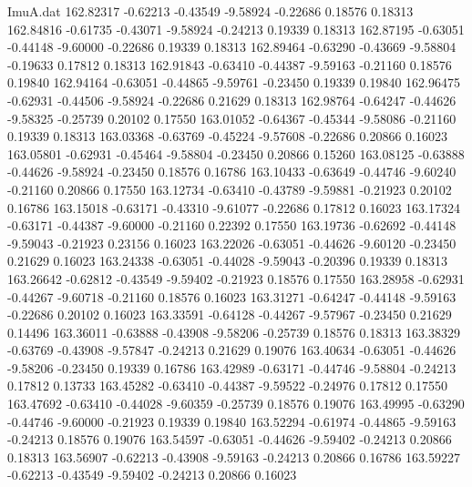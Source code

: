 \begin{filecontents}{ImuA.dat}
 162.82317   -0.62213   -0.43549   -9.58924   -0.22686    0.18576    0.18313
 162.84816   -0.61735   -0.43071   -9.58924   -0.24213    0.19339    0.18313
 162.87195   -0.63051   -0.44148   -9.60000   -0.22686    0.19339    0.18313
 162.89464   -0.63290   -0.43669   -9.58804   -0.19633    0.17812    0.18313
 162.91843   -0.63410   -0.44387   -9.59163   -0.21160    0.18576    0.19840
 162.94164   -0.63051   -0.44865   -9.59761   -0.23450    0.19339    0.19840
 162.96475   -0.62931   -0.44506   -9.58924   -0.22686    0.21629    0.18313
 162.98764   -0.64247   -0.44626   -9.58325   -0.25739    0.20102    0.17550
 163.01052   -0.64367   -0.45344   -9.58086   -0.21160    0.19339    0.18313
 163.03368   -0.63769   -0.45224   -9.57608   -0.22686    0.20866    0.16023
 163.05801   -0.62931   -0.45464   -9.58804   -0.23450    0.20866    0.15260
 163.08125   -0.63888   -0.44626   -9.58924   -0.23450    0.18576    0.16786
 163.10433   -0.63649   -0.44746   -9.60240   -0.21160    0.20866    0.17550
 163.12734   -0.63410   -0.43789   -9.59881   -0.21923    0.20102    0.16786
 163.15018   -0.63171   -0.43310   -9.61077   -0.22686    0.17812    0.16023
 163.17324   -0.63171   -0.44387   -9.60000   -0.21160    0.22392    0.17550
 163.19736   -0.62692   -0.44148   -9.59043   -0.21923    0.23156    0.16023
 163.22026   -0.63051   -0.44626   -9.60120   -0.23450    0.21629    0.16023
 163.24338   -0.63051   -0.44028   -9.59043   -0.20396    0.19339    0.18313
 163.26642   -0.62812   -0.43549   -9.59402   -0.21923    0.18576    0.17550
 163.28958   -0.62931   -0.44267   -9.60718   -0.21160    0.18576    0.16023
 163.31271   -0.64247   -0.44148   -9.59163   -0.22686    0.20102    0.16023
 163.33591   -0.64128   -0.44267   -9.57967   -0.23450    0.21629    0.14496
 163.36011   -0.63888   -0.43908   -9.58206   -0.25739    0.18576    0.18313
 163.38329   -0.63769   -0.43908   -9.57847   -0.24213    0.21629    0.19076
 163.40634   -0.63051   -0.44626   -9.58206   -0.23450    0.19339    0.16786
 163.42989   -0.63171   -0.44746   -9.58804   -0.24213    0.17812    0.13733
 163.45282   -0.63410   -0.44387   -9.59522   -0.24976    0.17812    0.17550
 163.47692   -0.63410   -0.44028   -9.60359   -0.25739    0.18576    0.19076
 163.49995   -0.63290   -0.44746   -9.60000   -0.21923    0.19339    0.19840
 163.52294   -0.61974   -0.44865   -9.59163   -0.24213    0.18576    0.19076
 163.54597   -0.63051   -0.44626   -9.59402   -0.24213    0.20866    0.18313
 163.56907   -0.62213   -0.43908   -9.59163   -0.24213    0.20866    0.16786
 163.59227   -0.62213   -0.43549   -9.59402   -0.24213    0.20866    0.16023

\end{filecontents}
